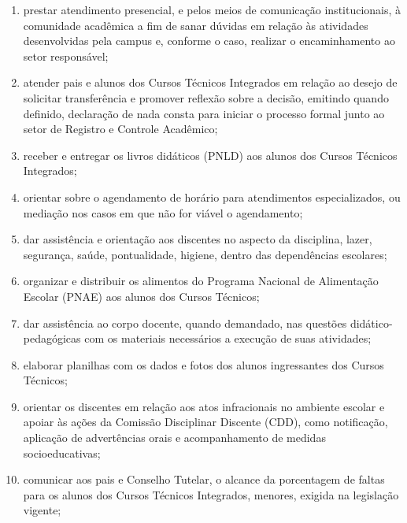 \documentclass[a4paper,12pt]{report}
\begin{document}
\begin{enumerate}
\renewcommand{\labelenumi}{\Roman{enumi}}

\item prestar atendimento presencial, e pelos meios de comunicação institucionais, à 
      comunidade acadêmica a fim de sanar dúvidas em relação às atividades desenvolvidas pela campus e, conforme o caso, realizar o encaminhamento 
      ao setor responsável;

\item atender pais e alunos dos Cursos Técnicos Integrados em relação ao desejo de 
      solicitar transferência e promover reflexão sobre a decisão, emitindo quando definido, declaração de nada consta para iniciar o processo formal 
      junto ao setor de Registro e Controle Acadêmico;

\item receber e entregar os livros didáticos (PNLD) aos alunos dos Cursos Técnicos 
      Integrados;

\item orientar sobre o agendamento de horário para atendimentos especializados, ou mediação       nos casos em que não for viável o agendamento;

\item dar assistência e orientação aos discentes no aspecto da disciplina, lazer, 
      segurança, saúde, pontualidade, higiene, dentro das dependências escolares;

\item organizar e distribuir os alimentos do Programa Nacional de Alimentação Escolar 
      (PNAE) aos alunos dos Cursos Técnicos;

\item dar assistência ao corpo docente, quando demandado, nas questões didático-pedagógicas       com os materiais necessários a execução de suas atividades;

\item elaborar planilhas com os dados e fotos dos alunos ingressantes dos Cursos Técnicos;

\item orientar os discentes em relação aos atos infracionais no ambiente escolar e apoiar 
      às ações da Comissão Disciplinar Discente (CDD), como notificação, aplicação de advertências orais e acompanhamento de medidas socioeducativas;

\item comunicar aos pais e Conselho Tutelar, o alcance da porcentagem de faltas para os 
      alunos dos Cursos Técnicos Integrados, menores, exigida na legislação vigente;


\end{enumerate}
\end{document}
